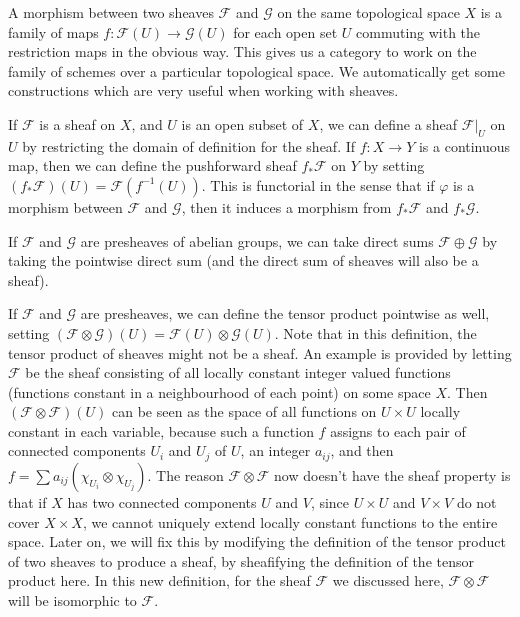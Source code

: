 A morphism between two sheaves $\mathcal{F}$ and $\mathcal{G}$ on the same topological space $X$ is a family of maps $f: \mathcal{F}(U) \to \mathcal{G}(U)$ for each open set $U$ commuting with the restriction maps in the obvious way. This gives us a category to work on the family of schemes over a particular topological space. We automatically get some constructions which are very useful when working with sheaves.

\begin{example}
    If $\mathcal{F}$ is a sheaf on $X$, and $U$ is an open subset of $X$, we can define a sheaf $\mathcal{F}|_U$ on $U$ by restricting the domain of definition for the sheaf. If $f: X \to Y$ is a continuous map, then we can define the pushforward sheaf $f_* \mathcal{F}$ on $Y$ by setting $(f_* \mathcal{F})(U) = \mathcal{F}(f^{-1}(U))$. This is functorial in the sense that if $\varphi$ is a morphism between $\mathcal{F}$ and $\mathcal{G}$, then it induces a morphism from $f_* \mathcal{F}$ and $f_* \mathcal{G}$.
\end{example}

\begin{example}
    If $\mathcal{F}$ and $\mathcal{G}$ are presheaves of abelian groups, we can take direct sums $\mathcal{F} \oplus \mathcal{G}$ by taking the pointwise direct sum (and the direct sum of sheaves will also be a sheaf).
\end{example}

\begin{example}
    If $\mathcal{F}$ and $\mathcal{G}$ are presheaves, we can define the tensor product pointwise as well, setting $(\mathcal{F} \otimes \mathcal{G})(U) = \mathcal{F}(U) \otimes \mathcal{G}(U)$. Note that in this definition, the tensor product of sheaves might not be a sheaf. An example is provided by letting $\mathcal{F}$ be the sheaf consisting of all locally constant integer valued functions (functions constant in a neighbourhood of each point) on some space $X$. Then $(\mathcal{F} \otimes \mathcal{F})(U)$ can be seen as the space of all functions on $U \times U$ locally constant in each variable, because such a function $f$ assigns to each pair of connected components $U_i$ and $U_j$ of $U$, an integer $a_{ij}$, and then $f = \sum a_{ij} (\chi_{U_i} \otimes \chi_{U_j})$. The reason $\mathcal{F} \otimes \mathcal{F}$ now doesn't have the sheaf property is that if $X$ has two connected components $U$ and $V$, since $U \times U$ and $V \times V$ do not cover $X \times X$, we cannot uniquely extend locally constant functions to the entire space. Later on, we will fix this by modifying the definition of the tensor product of two sheaves to produce a sheaf, by sheafifying the definition of the tensor product here. In this new definition, for the sheaf $\mathcal{F}$ we discussed here, $\mathcal{F} \otimes \mathcal{F}$ will be isomorphic to $\mathcal{F}$.
\end{example}

